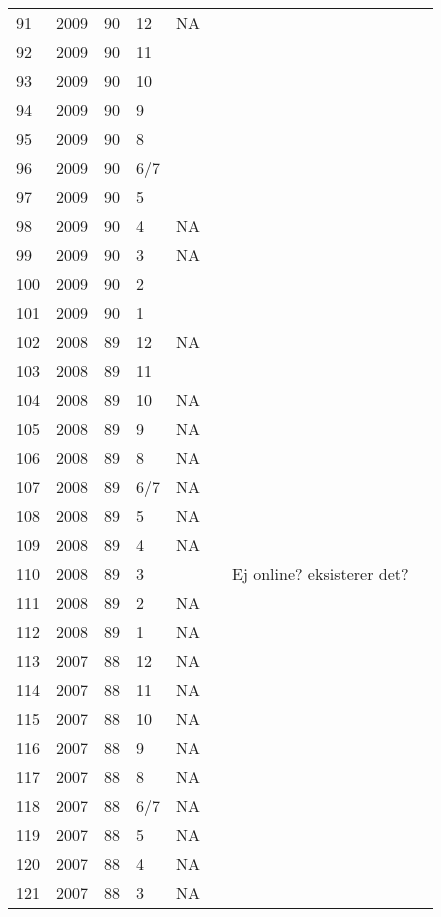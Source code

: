 \begin{longtable}{ |l|l|l|l|l|l|l|l| }
 91 & 2009 & 90 &    12 &      NA &  &  & \\
 92 & 2009 & 90 &    11 &         &  &  & \\
 93 & 2009 & 90 &    10 &         &  &  & \\
 94 & 2009 & 90 &     9 &         &  &  & \\
 95 & 2009 & 90 &     8 &         &  &  & \\
 96 & 2009 & 90 &   6/7 &         &  &  & \\
 97 & 2009 & 90 &     5 &         &  &  & \\
 98 & 2009 & 90 &     4 &      NA &  &  & \\
 99 & 2009 & 90 &     3 &      NA &  &  & \\
100 & 2009 & 90 &     2 &         &  &  & \\
101 & 2009 & 90 &     1 &         &  &  & \\
102 & 2008 & 89 &    12 &      NA &  &  & \\
103 & 2008 & 89 &    11 &         &  &  & \\
104 & 2008 & 89 &    10 &      NA &  &  & \\
105 & 2008 & 89 &     9 &      NA &  &  & \\
106 & 2008 & 89 &     8 &      NA &  &  & \\
107 & 2008 & 89 &   6/7 &      NA &  &  & \\
108 & 2008 & 89 &     5 &      NA &  &  & \\
109 & 2008 & 89 &     4 &      NA &  &  & \\
110 & 2008 & 89 &     3 &         &  & Ej online? eksisterer det? & \\
111 & 2008 & 89 &     2 &      NA &  &  & \\
112 & 2008 & 89 &     1 &      NA &  &  & \\
113 & 2007 & 88 &    12 &      NA &  &  & \\
114 & 2007 & 88 &    11 &      NA &  &  & \\
115 & 2007 & 88 &    10 &      NA &  &  & \\
116 & 2007 & 88 &     9 &      NA &  &  & \\
117 & 2007 & 88 &     8 &      NA &  &  & \\
118 & 2007 & 88 &   6/7 &      NA &  &  & \\
119 & 2007 & 88 &     5 &      NA &  &  & \\
120 & 2007 & 88 &     4 &      NA &  &  & \\
121 & 2007 & 88 &     3 &      NA &  &  & \\

\end{longtable}
